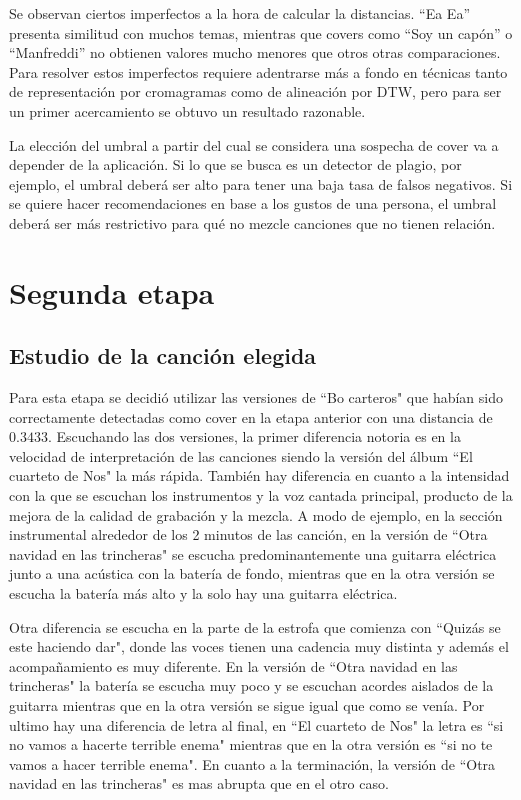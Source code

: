 \documentclass{article}
\begin{document}
Se observan ciertos imperfectos a la hora de calcular la distancias. ``Ea Ea'' presenta similitud con muchos temas, mientras que covers como ``Soy un capón'' o ``Manfreddi'' no obtienen valores mucho menores que otros otras comparaciones. Para resolver estos imperfectos requiere adentrarse más a fondo en técnicas tanto de representación por cromagramas como de alineación por DTW, pero para ser un primer acercamiento se obtuvo un resultado razonable.

La elección del umbral a partir del cual se considera una sospecha de cover va a depender de la aplicación. Si lo que se busca es un detector de plagio, por ejemplo, el umbral deberá ser alto para tener una baja tasa de falsos negativos. Si se quiere hacer recomendaciones en base a los gustos de una persona, el umbral deberá ser más restrictivo para qué no mezcle canciones que no tienen relación.


\section{Segunda etapa}

\subsection{Estudio de la canción elegida}

Para esta etapa se decidió utilizar las versiones de ``Bo carteros" que habían sido correctamente detectadas como cover en la etapa anterior con una distancia de $0.3433$. Escuchando las dos versiones, la primer diferencia notoria es en la velocidad de interpretación de las canciones siendo la versión del álbum ``El cuarteto de Nos" la más rápida. También hay diferencia en cuanto a la intensidad con la que se escuchan los instrumentos y la voz cantada principal, producto de la mejora de la calidad de grabación y la mezcla. A modo de ejemplo, en la sección instrumental alrededor de los 2 minutos de las canción, en la versión de ``Otra navidad en las trincheras" se escucha predominantemente una guitarra eléctrica junto a una acústica con la batería de fondo, mientras que en la otra versión se escucha la batería más alto y la solo hay una guitarra eléctrica.

Otra diferencia se escucha en la parte de la estrofa que comienza con ``Quizás se este haciendo dar", donde las voces tienen una cadencia muy distinta y además el acompañamiento es muy diferente. En la versión de ``Otra navidad en las trincheras" la batería se escucha muy poco y se escuchan acordes aislados de la guitarra mientras que en la otra versión se sigue igual que como se venía.  Por ultimo hay una diferencia de letra al final, en ``El cuarteto de Nos" la letra es ``si no vamos a hacerte terrible enema" mientras que en la otra versión es ``si no te vamos a hacer terrible enema". En cuanto a la terminación, la versión de ``Otra navidad en las trincheras" es mas abrupta que en el otro caso. 
\end{document}
